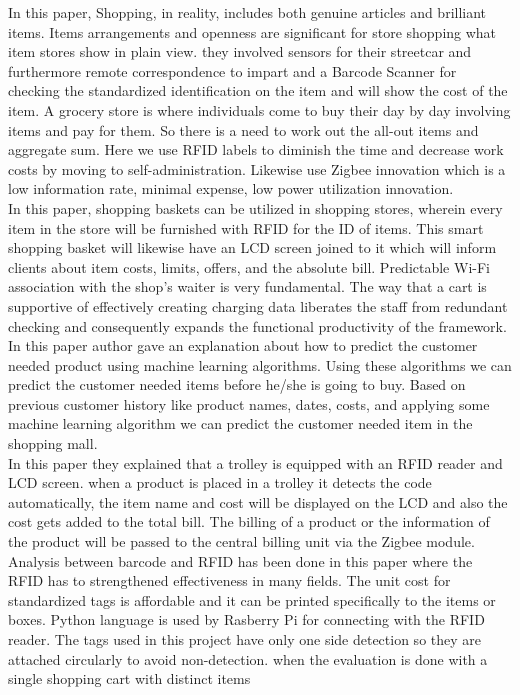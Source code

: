 \documentclass[conference]{IEEEtran}
\begin{document}
In this paper\cite{b2}, Shopping, in reality, includes both genuine articles and brilliant items. Items arrangements and openness are significant for store shopping what item stores show in plain view. they involved sensors for their streetcar and furthermore remote correspondence to impart and a Barcode Scanner for checking the standardized identification on the item and will show the cost of the item.
A grocery store is where individuals come to buy their day by day involving items and pay for them. So there is a need to work out the all-out items and aggregate sum. Here we use RFID labels to diminish the time and decrease work costs by moving to self-administration. Likewise use Zigbee innovation which is a low information rate, minimal expense, low power utilization innovation.\\

In this paper\cite{b3}, shopping baskets can be utilized in shopping stores, wherein every item in the store will be furnished with RFID for the ID of items. This smart shopping basket will likewise have an LCD screen joined to it which will inform clients about item costs, limits, offers, and the absolute bill. Predictable Wi-Fi association with the shop's waiter is very fundamental. The way that a cart is supportive of effectively creating charging data liberates the staff from redundant checking and consequently expands the functional productivity of the framework.\\

In this paper\cite{b4} author gave an explanation about how to predict the customer needed product using machine learning algorithms. Using these algorithms we can predict the customer needed items before he/she is going to buy. Based on previous customer history like product names, dates, costs, and applying some machine learning algorithm we can predict the customer needed item in the shopping mall.\\

In this paper\cite{b5} they explained that a trolley is equipped with an
RFID reader and LCD screen. when a product is placed in a trolley it detects
the code automatically, the item name and cost will be displayed on the LCD
and also the cost gets added to the total bill. The billing of a product or the
information of the product will be passed to the central billing unit via the
Zigbee module. Analysis between barcode and RFID has been done in this
paper where the RFID has to strengthened effectiveness in many fields. The
unit cost for standardized tags is affordable and it can be printed specifically to
the items or boxes. Python language is used by Rasberry Pi for connecting with
the RFID reader. The tags used in this project have only one side detection
so they are attached circularly to avoid non-detection. when the evaluation is
done with a single shopping cart with distinct items\\
\end{document}
